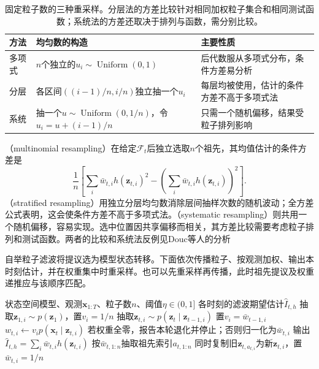\begin{table}[htbp]
  \centering
  \begin{tabularx}{\linewidth}{@{}lXX@{}}
    \toprule
    方法 & 均匀数的构造 & 主要性质\\
    \midrule
    多项式 & $n$个独立的$u_i\sim\operatorname{Uniform}(0,1)$ & 后代数服从多项式分布，条件方差易分析\\
    分层 & 各区间$((i-1)/n,i/n)$独立抽一个$u_i$ & 每层均被使用，估计的条件方差不高于多项式法\\
    系统 & 抽一个$u\sim\operatorname{Uniform}(0,1/n)$，令$u_i=u+(i-1)/n$ & 只需一个随机偏移，结果受粒子排列影响\\
    \bottomrule
  \end{tabularx}
  \caption{固定粒子数的三种重采样。分层法的方差比较针对相同加权粒子集合和相同测试函数；系统法的方差还取决于排列与函数，需分别比较。}
  \label{tab:pgm-sampling-resampling}
\end{table}

（multinomial resampling）在给定$\mathcal{F}_t$后独立选取$n$个祖先，其均值估计的条件方差是
\begin{equation}
  \frac1n\left[
    \sum_i\bar w_{t,i}h(\bm{z}_{t,i})^2
      -\left(\sum_i\bar w_{t,i}h(\bm{z}_{t,i})\right)^2
  \right].
  \label{eq:pgm-sampling-resampling-variance}
\end{equation}
（stratified resampling）用独立分层均匀数消除层间抽样次数的随机波动；全方差公式表明，这会使条件方差不高于多项式法。（systematic resampling）则共用一个随机偏移，容易实现。选中位置因共享偏移而相关，其方差比较需要考虑粒子排列和测试函数。两者的比较和系统法反例见Douc等人的分析

自举粒子滤波将提议选为模型状态转移。下面依次传播粒子、按观测加权、输出本时刻估计，并在权重集中时重采样。也可以先重采样再传播，此时祖先提议及权重递推应与该顺序匹配。

\begin{algorithm}[带阈值重采样的自举粒子滤波]
  \label{alg:pgm-sampling-bootstrap}
  \begin{algorithmic}[1]
    \Require 状态空间模型、观测$\bm{x}_{1:T}$、粒子数$n$、阈值$\eta\in(0,1]$
    \Ensure 各时刻的滤波期望估计$\widehat I_{t,h}$
          \State 抽取$\bm{z}_{1,i}\sim p(\bm{z}_1)$，置$v_i=1/n$
        \Else
          \State 抽取$\bm{z}_{t,i}\sim p(\bm{z}_t\mid\bm{z}_{t-1,i})$
          \State 置$v_i=\bar w_{t-1,i}$
        \EndIf
        \State $w_{t,i}\gets v_i p(\bm{x}_t\mid\bm{z}_{t,i})$
      \EndFor
      \State 若权重全零，报告本轮退化并停止；否则归一化为$\bar w_{t,i}$
      \State 输出$\widehat I_{t,h}=\sum_i\bar w_{t,i}h(\bm{z}_{t,i})$
        \State 按$\bar w_{t,1:n}$抽取祖先索引$a_{t,1:n}$
        \State 同时复制旧$\bm{z}_{t,a_{t,i}}$为新$\bm{z}_{t,i}$，置$\bar w_{t,i}=1/n$
      \EndIf
    \EndFor
  \end{algorithmic}
\end{algorithm}

